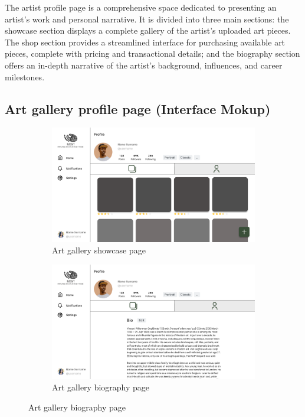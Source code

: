 The artist profile page is a comprehensive space dedicated to presenting an artist’s work and personal narrative. 
It is divided into three main sections: the showcase section displays a complete gallery of the artist’s uploaded art pieces.
The shop section provides a streamlined interface for purchasing available art pieces, complete with pricing and transactional details; 
and the biography section offers an in-depth narrative of the artist’s background, influences, and career milestones.

\subsection{Art gallery profile page (Interface Mokup)}
\begin{figure}[H]
    \centering
\begin{subfigure}[b]{\myfigwidth}
    \centering
    \includegraphics[width=\textwidth]{images/interface_mockups/Art gallery profile - showcase.pdf}
    \caption{Art gallery showcase page}
\end{subfigure}
\begin{subfigure}[b]{\myfigwidth}
    \centering
    \includegraphics[width=\textwidth]{images/interface_mockups/Art gallery profile - bio.pdf}
    \caption{Art gallery biography page}
\end{subfigure}
\end{figure}

